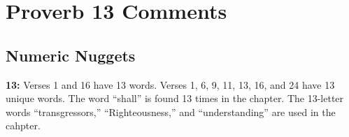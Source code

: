 \section{Proverb 13 Comments}

\subsection{Numeric Nuggets}
\textbf{13:} Verses 1 and 16 have 13 words. Verses 1, 6, 9, 11, 13, 16, and 24 have 13 unique words. The word ``shall'' is found 13 times in the chapter.  The 13-letter words ``transgressors,'' ``Righteousness,'' and ``understanding'' are used in the cahpter.

